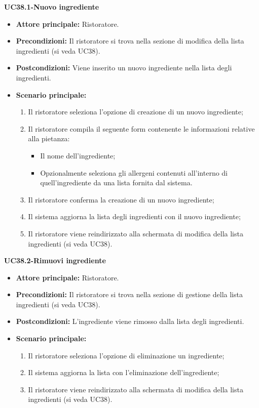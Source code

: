 \pagebreak
\textbf{UC38.1-Nuovo ingrediente}
\begin{itemize}
    \item \textbf{Attore principale:} Ristoratore.
    \item \textbf{Precondizioni:} Il ristoratore si trova nella sezione di modifica della lista ingredienti (si veda UC38).
    \item \textbf{Postcondizioni:} Viene inserito un nuovo ingrediente nella lista degli ingredienti.
    \item \textbf{Scenario principale:}
    \begin{enumerate}
        \item Il ristoratore seleziona l'opzione di creazione di un nuovo ingrediente;
        \item Il ristoratore compila il seguente form contenente le informazioni relative alla pietanza:
        \begin{itemize}
            \item Il nome dell'ingrediente;
            \item Opzionalmente seleziona gli allergeni contenuti all'interno di quell'ingrediente da una lista fornita dal sistema.
        \end{itemize}
        \item Il ristoratore conferma la creazione di un nuovo ingrediente;
        \item Il sistema aggiorna la lista degli ingredienti con il nuovo ingrediente;
        \item Il ristoratore viene reindirizzato alla schermata di modifica della lista ingredienti (si veda UC38).
    \end{enumerate}
\end{itemize}


\textbf{UC38.2-Rimuovi ingrediente}
\begin{itemize}
    \item \textbf{Attore principale:} Ristoratore.
    \item \textbf{Precondizioni:} Il ristoratore si trova nella sezione di gestione della lista ingredienti (si veda UC38).
    \item \textbf{Postcondizioni:} L'ingrediente viene rimosso dalla lista degli ingredienti.
    \item \textbf{Scenario principale:}
    \begin{enumerate}
        \item Il ristoratore seleziona l'opzione di eliminazione un ingrediente;
        \item Il sistema aggiorna la lista con l'eliminazione dell'ingrediente;
        \item Il ristoratore viene reindirizzato alla schermata di modifica della lista ingredienti (si veda UC38).
    \end{enumerate}
\end{itemize}
\pagebreak
